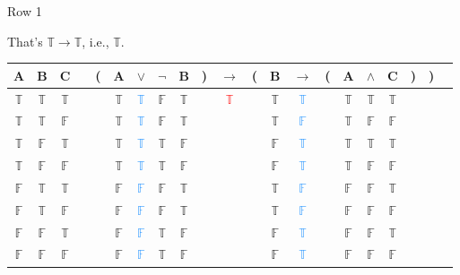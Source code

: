 \documentclass[
  ignorenonframetext,
]{beamer}
\renewcommand{\,}{\text{, }}
\def\True{\mathbb{T}}
\def\False{\mathbb{F}}
\begin{document}
\begin{frame}{Row 1}
\protect\hypertarget{row-1-1}{}

That's \(\True \rightarrow \True\), i.e., \(\True\).

\begin{center}
\bigskip
\begin{tabular}{@{ }c@{ }@{ }c@{ }@{ }c | c@{ }@{}c@{}@{ }c@{ }@{ }c@{ }@{ }c@{ }@{ }c@{ }@{}c@{}@{ }c@{ }@{}c@{}@{ }c@{ }@{ }c@{ }@{}c@{}@{ }c@{ }@{ }c@{ }@{ }c@{ }@{}c@{}@{}c@{}@{ }c}
A & B & C &  & ( & A & $\vee$ & $\neg$ & B & ) & $\rightarrow$ & ( & B & $\rightarrow$ & ( & A & $\wedge$ & C & ) & ) & \\
\hline 
 $\True$ & $\True$ & $\True$ &  &  & $\True$ & \textcolor{dodgerblue}{$\True$} & $\False$ & $\True$ &  &\textcolor{red}{$\True$}&  & $\True$ & \textcolor{dodgerblue}{$\True$} &  & $\True$ & $\True$ & $\True$ &  &  & \\
 $\True$ & $\True$ & $\False$ &  &  & $\True$ & \textcolor{dodgerblue}{$\True$} & $\False$ & $\True$ &  &&  & $\True$ & \textcolor{dodgerblue}{$\False$} &  & $\True$ & $\False$ & $\False$ &  &  & \\
 $\True$ & $\False$ & $\True$ &  &  & $\True$ & \textcolor{dodgerblue}{$\True$} & $\True$ & $\False$ &  &&  & $\False$ & \textcolor{dodgerblue}{$\True$} &  & $\True$ & $\True$ & $\True$ &  &  & \\
 $\True$ & $\False$ & $\False$ &  &  & $\True$ & \textcolor{dodgerblue}{$\True$} & $\True$ & $\False$ &  &&  & $\False$ & \textcolor{dodgerblue}{$\True$} &  & $\True$ & $\False$ & $\False$ &  &  & \\
 $\False$ & $\True$ & $\True$ &  &  & $\False$ & \textcolor{dodgerblue}{$\False$} & $\False$ & $\True$ &  &&  & $\True$ & \textcolor{dodgerblue}{$\False$} &  & $\False$ & $\False$ & $\True$ &  &  & \\
 $\False$ & $\True$ & $\False$ &  &  & $\False$ & \textcolor{dodgerblue}{$\False$} & $\False$ & $\True$ &  &&  & $\True$ & \textcolor{dodgerblue}{$\False$} &  & $\False$ & $\False$ & $\False$ &  &  & \\
 $\False$ & $\False$ & $\True$ &  &  & $\False$ & \textcolor{dodgerblue}{$\False$} & $\True$ & $\False$ &  &&  & $\False$ & \textcolor{dodgerblue}{$\True$} &  & $\False$ & $\False$ & $\True$ &  &  & \\
 $\False$ & $\False$ & $\False$ &  &  & $\False$ & \textcolor{dodgerblue}{$\False$} & $\True$ & $\False$ &  &&  & $\False$ & \textcolor{dodgerblue}{$\True$} &  & $\False$ & $\False$ & $\False$ &  &  & \\
\end{tabular}
\bigskip
\end{center}

\end{frame}
\end{document}
